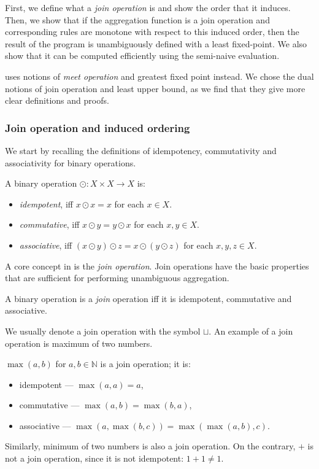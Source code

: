 First, we define what a \emph{join operation} is and show the order that it induces. Then, we show that if the aggregation function is a join operation and corresponding rules are monotone with respect to this induced order, then the result of the program is unambiguously defined with a least fixed-point. We also show that it can be computed efficiently using the semi-naive evaluation.

\cite{socialite} uses notions of \emph{meet operation} and greatest fixed point instead. We chose the dual notions of join operation and least upper bound, as we find that they give more clear definitions and proofs.

\subsubsection{Join operation and induced ordering}
We start by recalling the definitions of idempotency, commutativity and associativity for binary operations.
\begin{defn}
A binary operation $\odot: X \times X \to X$ is:
\begin{itemize}
\item \emph{idempotent}, iff $x \odot x = x$ for each $x \in X$.
\item \emph{commutative}, iff $x \odot y = y \odot x$ for each $x, y \in X$.
\item \emph{associative}, iff $(x \odot y) \odot z = x \odot (y \odot z)$ for each $x, y, z \in X$.
\end{itemize}
\end{defn}

A core concept in \datalogra is the \emph{join operation}. Join operations have the basic properties that are sufficient for performing unambiguous aggregation.

\begin{defn}
A binary operation is a \emph{join} operation iff it is idempotent, commutative and associative. 
\end{defn}

We usually denote a join operation with the symbol $\sqcup$.
An example of a join operation is maximum of two numbers.

\begin{exmp}
$\max(a, b)$ for $a, b \in \mathbb{N}$ is a join operation; it is:
\begin{itemize}
\item idempotent --- $\max(a, a) = a$,
\item commutative --- $\max(a, b) = \max(b, a)$,
\item associative --- $\max(a, \max(b, c)) = \max(\max(a, b), c)$.
\end{itemize}

Similarly, minimum of two numbers is also a join operation. On the contrary, $+$ is not a join operation, since it is not idempotent: $1+1 \ne 1$.
\end{exmp}

